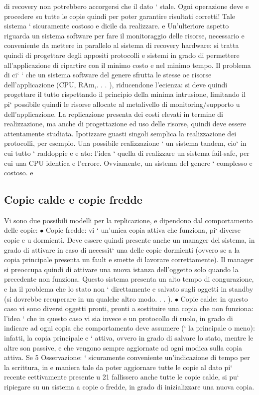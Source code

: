 \documentclass[a4paper,12pt]{article}
\begin{document}
di recovery non potrebbero accorgersi che il dato ` stale. Ogni operazione deve
e
procedere su tutte le copie quindi per poter garantire risultati corretti! Tale
sistema ` sicuramente costoso e dicile da realizzare.
e
Un'ulteriore aspetto riguarda un sistema software per fare il monitoraggio
delle risorse, necessario e conveniente da mettere in parallelo al sistema di recovery hardware: si tratta quindi di
progettare degli appositi protocolli e sistemi in
grado di permettere all'applicazione di ripartire con il minimo costo e nel minimo
tempo. Il problema di ci` ` che un sistema software del genere sfrutta le stesse
oe
risorse dell'applicazione (CPU, RAm,. . . ), riducendone l'ecienza: si deve quindi progettare il tutto rispettando il
principio della minima intrusione, limitando
il pi` possibile quindi le risorse allocate al metalivello di monitoring/supporto
u
dell'applicazione. La replicazione presenta dei costi elevati in termine di realizzazione, ma anche di progettazione ed
uso delle risorse, quindi deve essere
attentamente studiata. Ipotizzare guasti singoli semplica la realizzazione dei
protocolli, per esempio.
Una possibile realizzazione ` un sistema tandem, cio` in cui tutto ` raddoppie
e
e
ato: l'idea ` quella di realizzare un sistema fail-safe, per cui una CPU identica
e
l'errore. Ovviamente, un sistema del genere ` complesso e costoso.
e
\subsection{Copie calde e copie fredde}
Vi sono due possibili modelli per la replicazione, e dipendono dal comportamento
delle copie:
$\bullet$ Copie fredde: vi ` un'unica copia attiva che funziona, pi` diverse copie
e
u
dormienti. Deve essere quindi presente anche un manager del sistema, in
grado di attivare in caso di necessit` una delle copie dormienti (ovvero se
a
la copia principale presenta un fault e smette di lavorare correttamente).
Il manager si preoccupa quindi di attivare una nuova istanza dell'oggetto
solo quando la precedente non funziona. Questo sistema presenta un alto
tempo di congurazione, e ha il problema che lo stato non ` direttamente
e
salvato sugli oggetti in standby (si dovrebbe recuperare in un qualche altro
modo. . . ).
$\bullet$ Copie calde: in questo caso vi sono diversi oggetti pronti, pronti a sostituire una copia che non funziona:
l'idea ` che in questo caso vi sia invece
e
un protocollo di ruolo, in grado di indicare ad ogni copia che comportamento deve assumere (` la principale o meno):
infatti, la copia principale
e
` attiva, ovvero in grado di salvare lo stato, mentre le altre son passive,
e
che vengono sempre aggiornate ad ogni modica sulla copia attiva. Se
5 Osservazione: ` sicuramente conveniente un'indicazione di tempo per la scrittura, in
e
maniera tale da poter aggiornare tutte le copie al dato pi` recente eettivamente presente
u
21
fallissero anche tutte le copie calde, si pu` ripiegare su un sistema a copie
o
fredde, in grado di inizializzare una nuova copia.
\end{document}
